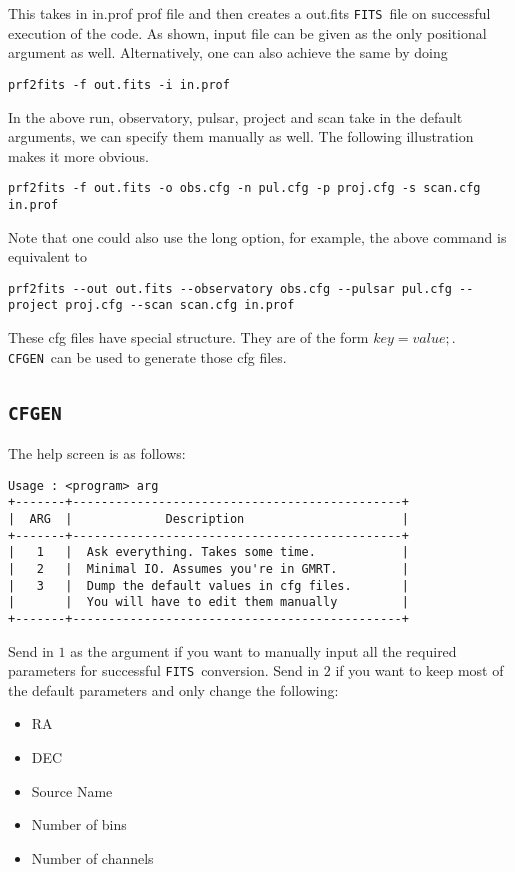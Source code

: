 \documentclass{article}
\newcommand{\cfgen}{\texttt{CFGEN}\ }
\newcommand{\fits}{\texttt{FITS}\ }
\begin{document}
This takes in in.prof prof file and then creates a out.fits \fits file on successful execution of the code. As shown, input file can be given as the only positional argument as well. Alternatively, one can also achieve the same by doing 
\begin{lstlisting}
prf2fits -f out.fits -i in.prof
\end{lstlisting}
\par In the above run, observatory, pulsar, project and scan take in the default arguments, we can specify them manually as well. The following illustration makes it more obvious. 
\begin{lstlisting}
prf2fits -f out.fits -o obs.cfg -n pul.cfg -p proj.cfg -s scan.cfg in.prof
\end{lstlisting}
Note that one could also use the long option, for example, the above command is equivalent to 
\begin{lstlisting}
prf2fits --out out.fits --observatory obs.cfg --pulsar pul.cfg --project proj.cfg --scan scan.cfg in.prof 
\end{lstlisting}

\par These cfg files have special structure. They are of the form $key=value;$. \cfgen can be used to generate those cfg files. 
\subsection*{\hfill \cfgen}
\par The help screen is as follows:
\begin{lstlisting}
Usage : <program> arg
+-------+----------------------------------------------+
|  ARG  |             Description                      |
+-------+----------------------------------------------+
|   1   |  Ask everything. Takes some time.            |
|   2   |  Minimal IO. Assumes you're in GMRT.         |
|   3   |  Dump the default values in cfg files.       |
|       |  You will have to edit them manually         |
+-------+----------------------------------------------+
\end{lstlisting}
Send in $1$ as the argument if you want to manually input all the required parameters for successful \fits conversion. Send in $2$ if you want to keep most of the default parameters and only change the following:
\begin{multicols}{4}
\begin{itemize}
\item RA
\item DEC
\item Source Name
\item Number of bins
\item Number of channels
\end{itemize}
\end{multicols}
\end{document}
